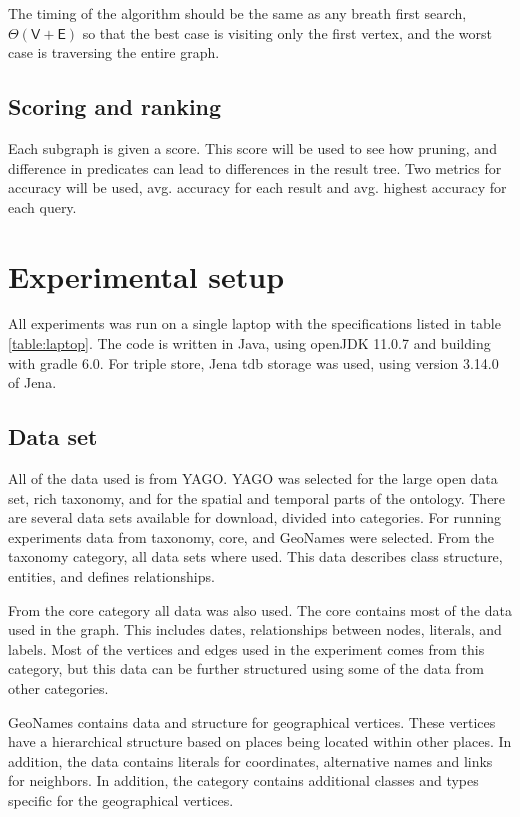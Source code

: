 The timing of the algorithm should be the same as any breath first search, $\Theta(\mathsf{V} + \mathsf{E})$ so that the best case is visiting only the first vertex, and the worst case is traversing the entire graph.

\subsection{Scoring and ranking}
Each subgraph is given a score. This score will be used to see how pruning, and difference in predicates can lead to differences in the result tree. Two metrics for accuracy will be used, avg. accuracy for each result and avg. highest accuracy for each query.

\section{Experimental setup}
\label{sec:experimentalSetup}
All experiments was run on a single laptop with the specifications listed in table \ref{table:laptop}. The code is written in Java, using openJDK 11.0.7 and building with gradle 6.0. For triple store, Jena tdb storage was used, using version 3.14.0 of Jena.


\subsection{Data set}
All of the data used is from YAGO. YAGO was selected for the large open data set, rich taxonomy, and for the spatial and temporal parts of the ontology. There are several data sets available for download, divided into categories. For running experiments data from taxonomy, core, and GeoNames were selected. From the taxonomy category, all data sets where used. This data describes class structure, entities, and defines relationships.

From the core category all data was also used. The core contains most of the data used in the graph. This includes dates, relationships between nodes, literals, and labels. Most of the vertices and edges used in the experiment comes from this category, but this data can be further structured using some of the data from other categories.

GeoNames contains data and structure for geographical vertices. These vertices have a hierarchical structure based on places being located within other places. In addition, the data contains literals for coordinates, alternative names and links for neighbors. In addition, the category contains additional classes and types specific for the geographical vertices.

